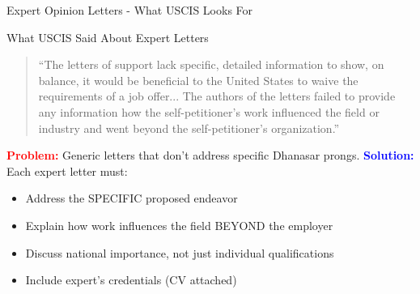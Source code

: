 \documentclass[11pt]{beamer}
\begin{document}
	
	\begin{frame}{Expert Opinion Letters - What USCIS Looks For}
		\scriptsize
		\begin{block}{What USCIS Said About Expert Letters}
			\begin{quote}
				``The letters of support lack specific, detailed information to show, on balance, it would be beneficial to the United States to waive the requirements of a job offer... The authors of the letters failed to provide any information how the self-petitioner's work influenced the field or industry and went beyond the self-petitioner's organization.''
			\end{quote}
			\textcolor{red}{\textbf{Problem:}} Generic letters that don't address specific Dhanasar prongs.
			\vspace{0.2cm}
			\textcolor{blue}{\textbf{Solution:}} Each expert letter must:
			\begin{itemize}
				\item Address the SPECIFIC proposed endeavor
				\item Explain how work influences the field BEYOND the employer
				\item Discuss national importance, not just individual qualifications
				\item Include expert's credentials (CV attached)
			\end{itemize}
		\end{block}
	\end{frame}
	
\end{document}
